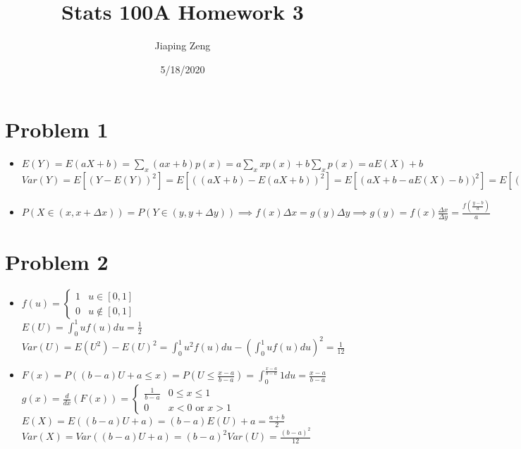 \documentclass{article}
\title{Stats 100A Homework 3}
\author{Jiaping Zeng}
\date{5/18/2020}
\begin{document}
\maketitle

\section*{Problem 1}
\begin{itemize}
	\item [(a)] $E(Y)=E(aX+b)=\sum_x (ax+b)p(x)=a\sum_x xp(x)+b\sum_x p(x)=aE(X)+b$\\$Var(Y)=E[(Y-E(Y))^2]=E[((aX+b)-E(aX+b))^2]=E[(aX+b-aE(X)-b))^2]=E[(a(X-E(X)))^2]=a^2E[(X-E(X))^2]=a^2Var(X)$
	\item [(b)] $P(X\in(x,x+\Delta x))=P(Y\in(y,y+\Delta y)) \implies f(x)\Delta x=g(y)\Delta y\implies g(y)=f(x)\frac{\Delta x}{\Delta y}=\boxed{\frac{f(\frac{y-b}{a})}{a}}$
\end{itemize}

\section*{Problem 2}
\begin{itemize}
	\item [(a)] $f(u)=\begin{cases}1&u\in[0,1]\\0&u\notin[0,1]\end{cases}$\\$E(U)=\int_0^1 uf(u)du=\boxed{\frac{1}{2}}$\\$Var(U)=E(U^2)-E(U)^2=\int_0^1 u^2f(u)du-(\int_0^1 uf(u)du)^2=\boxed{\frac{1}{12}}$
	\item [(b)] $F(x)=P((b-a)U+a\leq x)=P(U\leq\frac{x-a}{b-a})=\int_0^{\frac{x-a}{b-a}}1du=\frac{x-a}{b-a}$\\$g(x)=\frac{d}{dx}(F(x))=\begin{cases}\frac{1}{b-a}&0\leq x\leq 1\\0&x<0\text{ or }x>1\end{cases}$\\$E(X)=E((b-a)U+a)=(b-a)E(U)+a=\boxed{\frac{a+b}{2}}$\\$Var(X)=Var((b-a)U+a)=(b-a)^2Var(U)=\boxed{\frac{(b-a)^2}{12}}$
\end{itemize}
\end{document}
